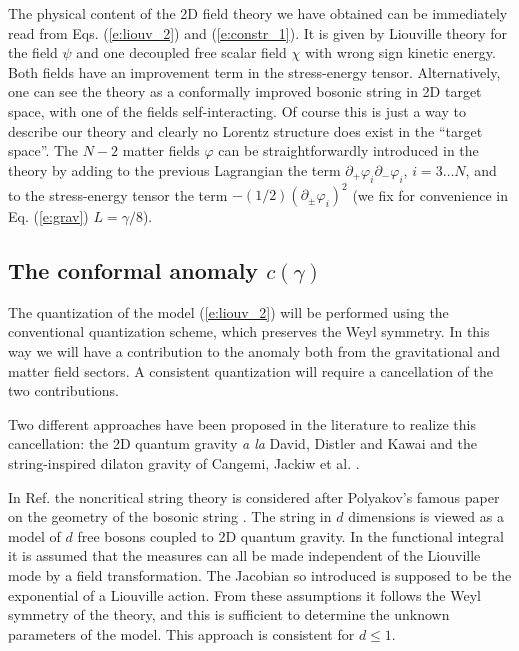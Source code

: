 \documentclass[a4paper,aps,prd,twocolumn,groupedaddress]{revtex4}
\begin{document}
The physical content of the 2D field theory we have obtained can be
immediately read from Eqs. (\ref{e:liouv_2}) and (\ref{e:constr_1}).
It is given by Liouville theory for the field $\psi$ and one decoupled
free scalar field $\chi$ with wrong sign kinetic energy. Both fields
have an improvement term in the stress-energy tensor. Alternatively,
one can see the theory as a  conformally improved bosonic string in 2D
target space, with one of the fields self-interacting. Of course this
is just a way to describe our theory and clearly no Lorentz structure
does exist in the ``target space''. The $N-2$ matter fields $\varphi$
can be straightforwardly introduced in the theory by adding to the
previous Lagrangian the term $\partial_+
\varphi_i\partial_-\varphi_i$, $i=3\ldots N$, and to the stress-energy
tensor the term $-(1/2)(\partial_\pm\varphi_i)^2$ (we fix for
convenience in Eq. (\ref{e:grav}) $L=\gamma/8$).

\subsection{The conformal anomaly $c(\gamma)$}
The quantization of the model (\ref{e:liouv_2}) will be performed
using the conventional quantization scheme, which preserves the Weyl
symmetry. In this way we will have a contribution to the anomaly both
from the gravitational and matter field sectors. A consistent
quantization will require a cancellation of the two contributions.

Two different approaches have been proposed in the literature to
realize this cancellation: the 2D quantum gravity {\sl a la} David,
Distler and Kawai \cite{kawai} and the string-inspired dilaton gravity
of Cangemi, Jackiw et al. \cite{jack}.

In Ref. \cite{kawai} the noncritical string theory is considered after
Polyakov's famous paper on the geometry of the bosonic string
\cite{pol}. The string in $d$ dimensions is viewed as a model of $d$
free bosons coupled to 2D quantum gravity. In the functional integral
it is assumed that the measures can all be made independent of the
Liouville mode by a field transformation. The Jacobian so introduced is
supposed to be the exponential of a Liouville action. From these
assumptions it follows the Weyl symmetry of the theory, and this is
sufficient to determine the unknown parameters of the model.  This
approach is consistent for $d\le1$.
\end{document}
